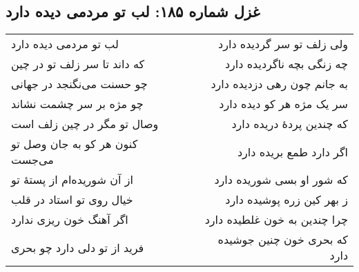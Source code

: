 \begin{center}
\section*{غزل شماره ۱۸۵: لب تو مردمی دیده دارد}
\label{sec:185}
\begin{longtable}{l p{0.5cm} r}
لب تو مردمی دیده دارد
&&
ولی زلف تو سر گردیده دارد
\\
که داند تا سر زلف تو در چین
&&
چه زنگی بچه ناگردیده دارد
\\
چو حسنت می‌نگنجد در جهانی
&&
به جانم چون رهی دزدیده دارد
\\
چو مژه بر سر چشمت نشاند
&&
سر یک مژه هر کو دیده دارد
\\
وصال تو مگر در چین زلف است
&&
که چندین پردهٔ دریده دارد
\\
کنون هر کو به جان وصل تو می‌جست
&&
اگر دارد طمع بریده دارد
\\
از آن شوریده‌ام از پستهٔ تو
&&
که شور او بسی شوریده دارد
\\
خیال روی تو استاد در قلب
&&
ز بهر کین زره پوشیده دارد
\\
اگر آهنگ خون ریزی ندارد
&&
چرا چندین به خون غلطیده دارد
\\
فرید از تو دلی دارد چو بحری
&&
که بحری خون چنین جوشیده دارد
\\
\end{longtable}
\end{center}
